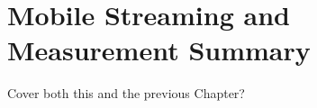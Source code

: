 







\section{Mobile Streaming and Measurement Summary}

Cover both this and the previous Chapter?








